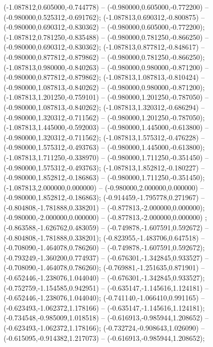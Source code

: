  (-1.087812,0.605000,-0.744778) -- (-0.980000,0.605000,-0.772200) -- (-0.980000,0.525312,-0.691762);
 (-1.087813,0.690312,-0.800875) -- (-0.980000,0.690312,-0.830362) -- (-0.980000,0.605000,-0.772200);
 (-1.087812,0.781250,-0.835488) -- (-0.980000,0.781250,-0.866250) -- (-0.980000,0.690312,-0.830362);
 (-1.087813,0.877812,-0.848617) -- (-0.980000,0.877812,-0.879862) -- (-0.980000,0.781250,-0.866250);
 (-1.087813,0.980000,-0.840263) -- (-0.980000,0.980000,-0.871200) -- (-0.980000,0.877812,-0.879862);
 (-1.087813,1.087813,-0.810424) -- (-0.980000,1.087813,-0.840262) -- (-0.980000,0.980000,-0.871200);
 (-1.087813,1.201250,-0.759101) -- (-0.980000,1.201250,-0.787050) -- (-0.980000,1.087813,-0.840262);
 (-1.087813,1.320312,-0.686294) -- (-0.980000,1.320312,-0.711562) -- (-0.980000,1.201250,-0.787050);
 (-1.087813,1.445000,-0.592003) -- (-0.980000,1.445000,-0.613800) -- (-0.980000,1.320312,-0.711562);
 (-1.087813,1.575312,-0.476228) -- (-0.980000,1.575312,-0.493763) -- (-0.980000,1.445000,-0.613800);
 (-1.087813,1.711250,-0.338970) -- (-0.980000,1.711250,-0.351450) -- (-0.980000,1.575312,-0.493763);
 (-1.087813,1.852812,-0.180227) -- (-0.980000,1.852812,-0.186863) -- (-0.980000,1.711250,-0.351450);
 (-1.087813,2.000000,0.000000) -- (-0.980000,2.000000,0.000000) -- (-0.980000,1.852812,-0.186863);
 (-0.914459,-1.795778,0.271967) -- (-0.804808,-1.781888,0.338201) -- (-0.877813,-2.000000,0.000000);
 (-0.980000,-2.000000,0.000000) -- (-0.877813,-2.000000,0.000000) ;
 (-0.863588,-1.626762,0.483059) -- (-0.749878,-1.607591,0.592672) -- (-0.804808,-1.781888,0.338201);
 (-0.823955,-1.483706,0.647518) -- (-0.708090,-1.464078,0.786260) -- (-0.749878,-1.607591,0.592672);
 (-0.793249,-1.360200,0.774937) -- (-0.676301,-1.342845,0.933527) -- (-0.708090,-1.464078,0.786260);
 (-0.769881,-1.251635,0.871901) -- (-0.652446,-1.238076,1.044040) -- (-0.676301,-1.342845,0.933527);
 (-0.752759,-1.154585,0.942951) -- (-0.635147,-1.145616,1.124181) -- (-0.652446,-1.238076,1.044040);
 (-0.741140,-1.066410,0.991165) -- (-0.623493,-1.062372,1.178166) -- (-0.635147,-1.145616,1.124181);
 (-0.734548,-0.985009,1.018518) -- (-0.616913,-0.985944,1.208652) -- (-0.623493,-1.062372,1.178166);
 (-0.732724,-0.908643,1.026090) -- (-0.615095,-0.914382,1.217073) -- (-0.616913,-0.985944,1.208652);

